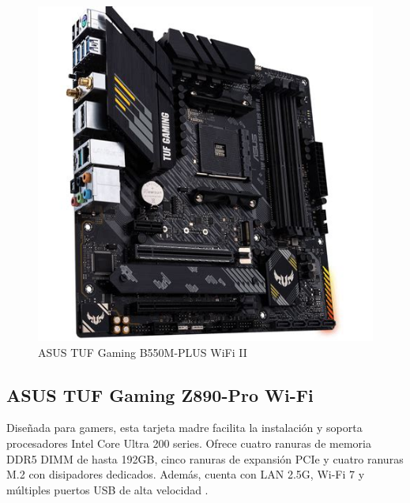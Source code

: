 \begin{figure}
  \centering
  \includegraphics[scale=0.2]{imagenes/asusb550.png}
  \caption{ASUS TUF Gaming B550M-PLUS WiFi II}
\end{figure}

\subsection{ASUS TUF Gaming Z890-Pro Wi-Fi}

Diseñada para gamers, esta tarjeta madre facilita la instalación y soporta procesadores Intel Core Ultra 200 series. Ofrece cuatro ranuras de memoria DDR5 DIMM de hasta 192GB, cinco ranuras de expansión PCIe y cuatro ranuras M.2 con disipadores dedicados. Además, cuenta con LAN 2.5G, Wi-Fi 7 y múltiples puertos USB de alta velocidad \cite{asustufz890}.

